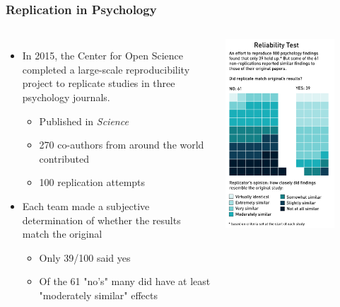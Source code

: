 \documentclass[10pt, block=fill]{beamer}
\begin{document}
\begin{frame}
  \frametitle{Replication in Psychology}
  
  \begin{columns}
    \begin{itemize}
      \item In 2015, the Center for Open Science completed a large-scale reproducibility project to replicate studies in three psychology journals.
      \begin{itemize}
        \item Published in \textit{Science}
        \item 270 co-authors from around the world contributed
        \item 100 replication attempts
      \end{itemize}
      \item Each team made a subjective determination of whether the results match the original
      \begin{itemize}
        \item Only 39/100 said yes
        \item Of the 61 "no's" many did have at least "moderately similar" effects
      \end{itemize}
    \end{itemize}
    
      \includegraphics[width=0.8\textwidth]{figures/reliability_test.png}
  \end{columns}
    
\end{frame}
\end{document}

